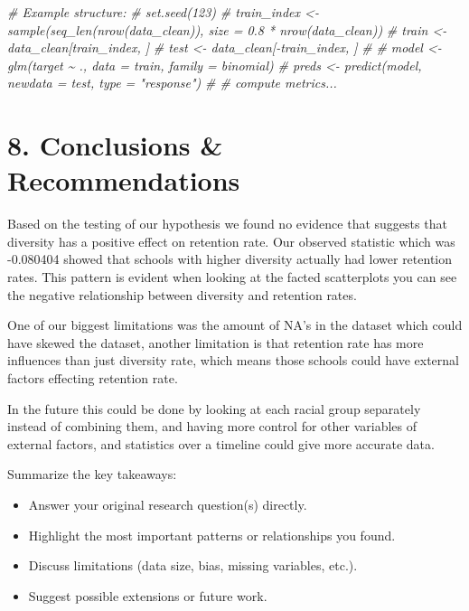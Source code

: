 \documentclass[
]{article}
\newenvironment{Shaded}{\begin{snugshade}}{\end{snugshade}}
\newcommand{\CommentTok}[1]{\textcolor[rgb]{0.56,0.35,0.01}{\textit{#1}}}
\providecommand{\tightlist}{%
  \setlength{\itemsep}{0pt}\setlength{\parskip}{0pt}}
\begin{document}
\begin{Shaded}
\begin{Highlighting}[]
\CommentTok{\# Example structure:}
\CommentTok{\# set.seed(123)}
\CommentTok{\# train\_index \textless{}{-} sample(seq\_len(nrow(data\_clean)), size = 0.8 * nrow(data\_clean))}
\CommentTok{\# train \textless{}{-} data\_clean[train\_index, ]}
\CommentTok{\# test  \textless{}{-} data\_clean[{-}train\_index, ]}
\CommentTok{\#}
\CommentTok{\# model \textless{}{-} glm(target \textasciitilde{} ., data = train, family = binomial)}
\CommentTok{\# preds \textless{}{-} predict(model, newdata = test, type = "response")}
\CommentTok{\# \# compute metrics...}
\end{Highlighting}
\end{Shaded}

\section{8. Conclusions \&
Recommendations}\label{conclusions-recommendations}

Based on the testing of our hypothesis we found no evidence that
suggests that diversity has a positive effect on retention rate. Our
observed statistic which was -0.080404 showed that schools with higher
diversity actually had lower retention rates. This pattern is evident
when looking at the facted scatterplots you can see the negative
relationship between diversity and retention rates.

One of our biggest limitations was the amount of NA's in the dataset
which could have skewed the dataset, another limitation is that
retention rate has more influences than just diversity rate, which means
those schools could have external factors effecting retention rate.

In the future this could be done by looking at each racial group
separately instead of combining them, and having more control for other
variables of external factors, and statistics over a timeline could give
more accurate data.

Summarize the key takeaways:

\begin{itemize}
\tightlist
\item
  Answer your original research question(s) directly.\\
\item
  Highlight the most important patterns or relationships you found.\\
\item
  Discuss limitations (data size, bias, missing variables, etc.).\\
\item
  Suggest possible extensions or future work.
\end{itemize}
\end{document}
